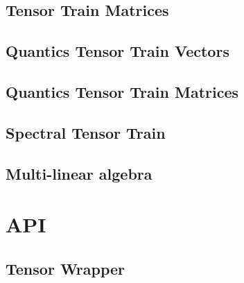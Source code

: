\documentclass[a4paper,10pt,english]{sphinxmanual}
\begin{document}
\section{Tensor Train Matrices}
\label{ttmat:tensor-train-matrices}\label{ttmat::doc}

\section{Quantics Tensor Train Vectors}
\label{qttvec::doc}\label{qttvec:quantics-tensor-train-vectors}

\section{Quantics Tensor Train Matrices}
\label{qttmat::doc}\label{qttmat:quantics-tensor-train-matrices}

\section{Spectral Tensor Train}
\label{stt:spectral-tensor-train}\label{stt::doc}

\section{Multi-linear algebra}
\label{multilinalg:multi-linear-algebra}\label{multilinalg::doc}

\chapter{API}
\label{api:api}\label{api::doc}

\section{Tensor Wrapper}
\label{api-tw:tensor-wrapper}\label{api-tw::doc}\label{api-tw:module-TensorToolbox}
\end{document}
